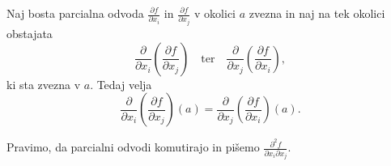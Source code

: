 \begin{izrek}
Naj bosta parcialna odvoda $\frac{\partial f}{\partial x_i}$ in $\frac{\partial f}{\partial x_j}$ v okolici $a$ zvezna in naj na tek okolici obstajata
\[
\frac{\partial}{\partial x_i}\left(\frac{\partial f}{\partial x_j}\right)\quad\text{ter}\quad\frac{\partial}{\partial x_j}\left(\frac{\partial f}{\partial x_i}\right),
\]
ki sta zvezna v $a$. Tedaj velja
\[
\frac{\partial}{\partial x_i}\left(\frac{\partial f}{\partial x_j}\right)(a)=\frac{\partial}{\partial x_j}\left(\frac{\partial f}{\partial x_i}\right)(a).
\]
\end{izrek}

\begin{opomba}
Pravimo, da parcialni odvodi komutirajo in pišemo $\frac{\partial^2f}{\partial x_i\partial x_j}$.
\end{opomba}
